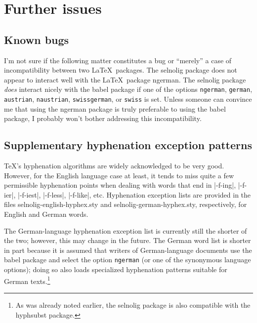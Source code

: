 \documentclass[11pt]{article}
\newcommand{\pkg}[1]{\textsf{#1}}
\newcommand{\opt}[1]{\texttt{#1}}
\begin{document}
\section{Further issues} \label{sec:further}

\subsection{Known bugs}

I'm not sure if the following matter constitutes a bug or \enquote{merely} a case of incompatibility between two \LaTeX\ packages. The \pkg{selnolig} package does not appear to interact well with the \LaTeX\ package \pkg{ngerman}. The \pkg{selnolig} package \emph{does} interact nicely with the \pkg{babel} package if one of the options \opt{ngerman}, \opt{german}, \opt{austrian}, \opt{naustrian}, \opt{swissgerman}, or \opt{swiss} is set. Unless someone can convince me that using the \pkg{ngerman} package is truly preferable to using the \pkg{babel} package, I probably won't bother addressing this incompatibility.



\subsection{Supplementary hyphenation exception patterns} \label{sec:addlhyph}

\TeX's hyphenation algorithms are widely acknowledged to be very good. However, for the English language case at least, it tends to miss quite a few permissible hyphenation points when dealing with words that end in |-f-ing|, |-f-ier|, |-f-iest|, |-f-less|, |-f-like|, etc. Hyphenation exception lists are provided in the files \pkg{selnolig-english-hyphex.sty} and \pkg{selnolig-german-hyphex.sty}, respectively, for English and German words.

\enlargethispage{0.5\baselineskip}

The German-language hyphenation exception list is currently still the shorter of the two; however, this may change in the future. The German word list is shorter in part because it is assumed that writers of German-language documents use the \pkg{babel} package and select the option \opt{ngerman} (or one of the synonymous language options); doing so also loads specialized hyphenation patterns suitable for German texts.\footnote{As was already noted earlier, the \pkg{selnolig} package is also compatible with the \pkg{hyphsubst} package.} 
\end{document}
